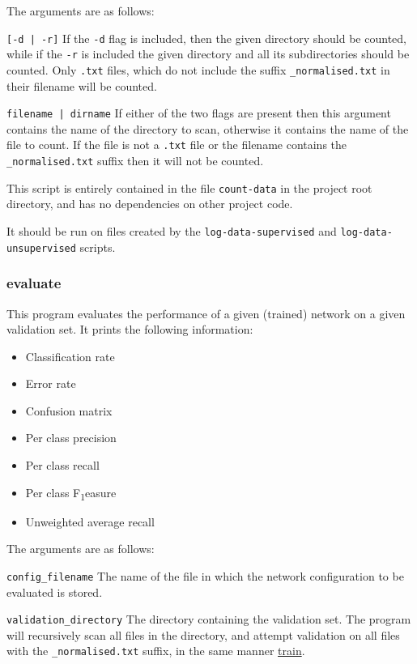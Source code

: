 \documentclass[a4paper]{article}
\begin{document}
The arguments are as follows:

\lstinline{[-d | -r]} If the \lstinline{-d} flag is included, then the given directory should be counted, while if the \lstinline{-r} is included the given directory and all its subdirectories should be counted. Only \lstinline{.txt} files, which do not include the suffix \lstinline{_normalised.txt} in their filename will be counted.

\lstinline{filename | dirname} If either of the two flags are present then this argument contains the name of the directory to scan, otherwise it contains the name of the file to count. If the file is not a \lstinline{.txt} file or the filename contains the \lstinline{_normalised.txt} suffix then it will not be counted.

This script is entirely contained in the file \lstinline{count-data} in the project root directory, and has no dependencies on other project code.

It should be run on files created by the \lstinline{log-data-supervised} and \lstinline{log-data-unsupervised} scripts.

\subsubsection{evaluate}
\label{subsubsec:dc_csa_evaluate}

This program evaluates the performance of a given (trained) network on a given validation set. It prints the following information:

\begin{itemize}
\item Classification rate
\item Error rate
\item Confusion matrix
\item Per class precision
\item Per class recall
\item Per class F\texorpdfstring{\textsubscript{1}} measure
\item Unweighted average recall
\end{itemize}

The arguments are as follows:

\lstinline{config_filename} The name of the file in which the network configuration to be evaluated is stored.

\lstinline{validation_directory} The directory containing the validation set. The program will recursively scan all files in the directory, and attempt validation on all files with the \lstinline{_normalised.txt} suffix, in the same manner \hyperref[subsubsec:dc_csa_train]{train}.
\end{document}
